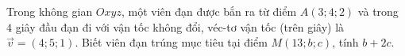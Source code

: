 \begin{ex}%
	Trong không gian $O x y z$, một viên đạn được bắn ra từ điểm $A(3 ; 4 ; 2)$ và trong $4$ giây đầu đạn đi với vận tốc không đổi, véc-tơ vận tốc (trên giây) là $\overrightarrow{v}=(4 ; 5 ; 1)$. Biết viên đạn trúng mục tiêu tại điểm $M(13 ; b ; c)$, tính $b+2 c$.\\
\end{ex}

